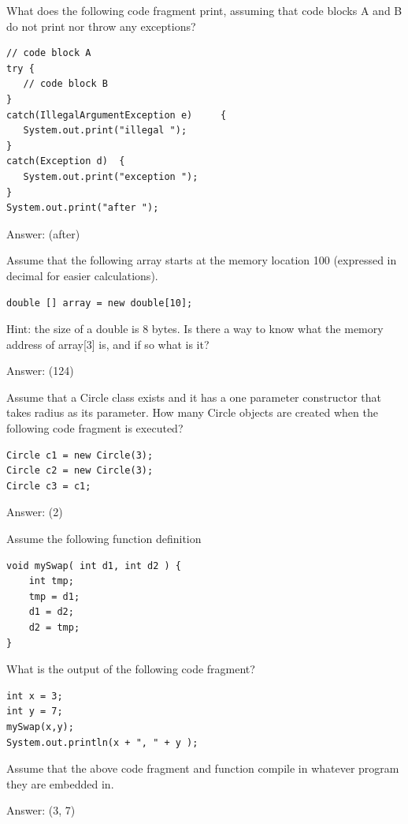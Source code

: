\begin{question}
What does the following code fragment print, assuming that code blocks A and B do not print nor throw any exceptions?

\begin{lstlisting}
// code block A
try {
   // code block B
}
catch(IllegalArgumentException e)     {
   System.out.print("illegal ");
}
catch(Exception d)  {
   System.out.print("exception ");
}
System.out.print("after ");
\end{lstlisting}

Answer: \underline{\hspace{1in}} \ifanswers (after)\fi
\end{question}

\begin{question}
Assume that the following array starts at the memory location 100 (expressed in decimal for easier calculations).

\begin{lstlisting}
double [] array = new double[10];
\end{lstlisting}

Hint: the size of a double is 8 bytes.
Is there a way to know what the memory address of array[3] is, and if so what is it?

Answer: \underline{\hspace{1in}} \ifanswers (124)\fi
\end{question}

\begin{question}
Assume that a Circle class exists and it has a one parameter constructor that takes radius as its parameter. How many Circle objects are created when the following code fragment is executed?

\begin{lstlisting}
Circle c1 = new Circle(3);
Circle c2 = new Circle(3);
Circle c3 = c1;
\end{lstlisting}

Answer: \underline{\hspace{1in}} \ifanswers (2)\fi
\end{question}

\begin{question}
Assume the following function definition

\begin{lstlisting}
void mySwap( int d1, int d2 ) {
    int tmp;
    tmp = d1;
    d1 = d2;
    d2 = tmp;
}
\end{lstlisting}

What is the output of the following code fragment?

\begin{lstlisting}
int x = 3;
int y = 7;
mySwap(x,y);
System.out.println(x + ", " + y );
\end{lstlisting}

Assume that the above code fragment and function compile in whatever program they are embedded in.

Answer: \underline{\hspace{1in}} \ifanswers (3, 7)\fi
\end{question}

